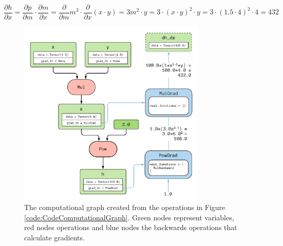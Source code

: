 \begin{equation}\label{eq:CalculatingDerivative}
    \frac{\partial h}{\partial x} = \frac{\partial p}{\partial m} \cdot \frac{\partial m}{\partial x} = \frac{\partial}{\partial m}m^3 \cdot \frac{\partial}{\partial x}(x\cdot y) = 3m^2 \cdot y = 3 \cdot (x \cdot y)^2 \cdot y = 3\cdot (1.5\cdot 4)^2 \cdot 4 = 432
\end{equation}

\begin{figure}[!h]
    \centering
    \includegraphics[width=0.8\textwidth]{img/background/Computational Graph.pdf}
    \caption{The computational graph created from the operations in Figure \ref{code:CodeComputationalGraph}. Green nodes represent variables, red nodes operations and blue nodes the backwards operations that calculate gradients.}
    \label{fig:ComputationalGraph}
\end{figure}


